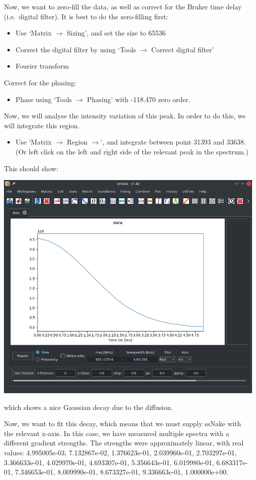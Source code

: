 \documentclass[11pt,a4paper]{article}
\begin{document}
Now, we want to zero-fill the data, as well as correct for the Bruker time delay (i.e.\ digital
filter). It is best to do the zero-filling first:
\begin{itemize}
  \item Use `Matrix $\longrightarrow$ Sizing', and set the size to 65536
  \item Correct the digital filter by using `Tools $\longrightarrow$ Correct digital filter'
  \item Fourier transform
\end{itemize}
Correct for the phasing:
\begin{itemize}
  \item Phase using `Tools $\longrightarrow$ Phasing' with -118.470 zero order.
\end{itemize}
Now, we will analyse the intensity variation of this peak. In
order to do this, we will integrate this region.
\begin{itemize}
  \item Use `Matrix $\longrightarrow$ Region $\longrightarrow$', and integrate between point 31393
	 and 33638. (Or left click on the left and right side of the relevant peak in the spectrum.)
\end{itemize}
This should show:
\begin{center}
\includegraphics[width=0.8\linewidth]{Figs/Fig1.png}
\end{center}
which shows  a nice Gaussian decay due to the diffusion.

Now, we want to fit this decay, which means that we must supply ssNake with the relevant x-axis. In
this case, we have measured multiple spectra with a different gradient strengths. The strengths were
approximately linear, with real values: 4.995005e-03, 7.132867e-02, 1.376623e-01,
2.039960e-01, 2.703297e-01, 3.366633e-01, 4.029970e-01,
4.693307e-01, 5.356643e-01, 6.019980e-01, 6.683317e-01,
7.346653e-01, 8.009990e-01, 8.673327e-01, 9.336663e-01,
1.000000e+00.
\end{document}
